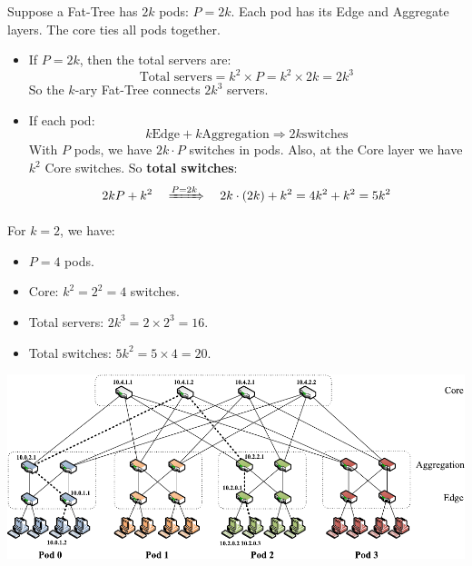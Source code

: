 \begin{examplebox}[: Fat-Tree with $2k$ pods and $k=2$]
    Suppose a Fat-Tree has $2k$ pods: $P = 2k$. Each pod has its Edge and Aggregate layers. The core ties all pods together.

    \begin{itemize}
        \item If $P = 2k$, then the total servers are:
        \begin{equation*}
            \text{Total servers} = k^2 \times P = k^2 \times 2k = 2k^3
        \end{equation*}
        So the $k$-ary Fat-Tree connects $2k^3$ servers.

        \item If each pod:
        \begin{equation*}
            k \text{Edge} + k \text{Aggregation} \Rightarrow 2k \text{switches}
        \end{equation*}
        With $P$ pods, we have $2k \cdot P$ switches in pods. Also, at the Core layer we have $k^2$ Core switches. So \textbf{total switches}:
        \begin{equation*}
            2k P + k^2 \quad \xRightarrow{P = 2k} \quad 2k \cdot \left(2k\right) + k^2 = 4k^2 + k^2 = 5k^2
        \end{equation*}
    \end{itemize}
    For $k=2$, we have:
    \begin{itemize}
        \item $P = 4$ pods.
        \item Core: $k^2 = 2^2 = 4$ switches.
        \item Total servers: $2k^3 = 2 \times 2^3 = 16$.
        \item Total switches: $5k^2 = 5 \times 4 = 20$.
    \end{itemize}
    \begin{center}
        \includegraphics[width=\textwidth]{img/fat-tree-compressed.pdf}
        \label{fig:fat-tree}
    \end{center}


\end{examplebox}
